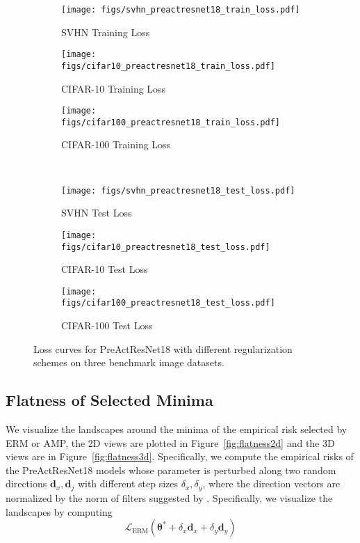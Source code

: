\documentclass[final]{cvpr}
\begin{document}
\begin{figure*}[t]
\centering
\begin{subfigure}{0.66\columnwidth}\centering \captionsetup{width=0.9\columnwidth}\texttt{[image: figs/svhn\_preactresnet18\_train\_loss.pdf]}\caption{SVHN Training Loss}\end{subfigure}\begin{subfigure}{0.66\columnwidth}\centering \captionsetup{width=0.9\columnwidth}\texttt{[image: figs/cifar10\_preactresnet18\_train\_loss.pdf]}\caption{CIFAR-10 Training Loss}\end{subfigure}\begin{subfigure}{0.66\columnwidth}\centering \captionsetup{width=0.9\columnwidth}\texttt{[image: figs/cifar100\_preactresnet18\_train\_loss.pdf]}\caption{CIFAR-100 Training Loss}\end{subfigure}\\
\begin{subfigure}{0.66\columnwidth}\centering \captionsetup{width=0.9\columnwidth}\texttt{[image: figs/svhn\_preactresnet18\_test\_loss.pdf]}\caption{SVHN Test Loss}\end{subfigure}\begin{subfigure}{0.66\columnwidth}\centering \captionsetup{width=0.9\columnwidth}\texttt{[image: figs/cifar10\_preactresnet18\_test\_loss.pdf]}\caption{CIFAR-10 Test Loss}\end{subfigure}\begin{subfigure}{0.66\columnwidth}\centering \captionsetup{width=0.9\columnwidth}\texttt{[image: figs/cifar100\_preactresnet18\_test\_loss.pdf]}\caption{CIFAR-100 Test Loss}\end{subfigure}\caption{Loss curves for PreActResNet18 with different regularization schemes on three benchmark image datasets.}
\label{fig:loss}
\end{figure*}

\subsection{Flatness of Selected Minima}

We visualize the landscapes around the minima of the empirical risk selected by ERM or AMP, the 2D views are plotted in Figure~\ref{fig:flatness2d} and the 3D views are in Figure~\ref{fig:flatness3d}. Specifically, we compute the empirical risks of the PreActResNet18 models whose parameter is perturbed along two random directions $\boldsymbol{d}_x,\boldsymbol{d}_j$ with different step sizes $\delta_x,\delta_y$, where the direction vectors are normalized by the norm of filters suggested by \cite{li2018visualizing}. 
Specifically, we visualize the landscapes by computing
\begin{equation*}
\mathcal{L}_\mathrm{ERM}(\boldsymbol{\theta}^\ast+\delta_x\boldsymbol{d}_x+\delta_y\boldsymbol{d}_y)
\end{equation*}
\end{document}
